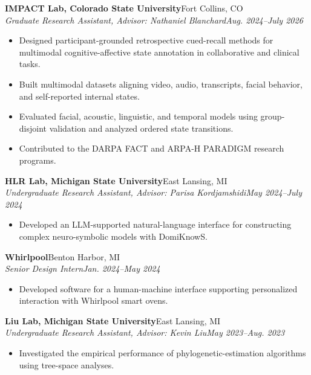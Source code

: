 \documentclass[9pt,letterpaper]{article}
\newcommand{\entry}[4]{\textbf{#1}\hfill #2\\\textit{#3}\hfill\textit{#4}\vspace{-3pt}}
\begin{document}
\entry{IMPACT Lab, Colorado State University}{Fort Collins, CO}{Graduate Research Assistant, Advisor: Nathaniel Blanchard}{Aug. 2024--July 2026}
\begin{itemize}
\item Designed participant-grounded retrospective cued-recall methods for multimodal cognitive-affective state annotation in collaborative and clinical tasks.
\item Built multimodal datasets aligning video, audio, transcripts, facial behavior, and self-reported internal states.
\item Evaluated facial, acoustic, linguistic, and temporal models using group-disjoint validation and analyzed ordered state transitions.
\item Contributed to the DARPA FACT and ARPA-H PARADIGM research programs.
\end{itemize}

\entry{HLR Lab, Michigan State University}{East Lansing, MI}{Undergraduate Research Assistant, Advisor: Parisa Kordjamshidi}{May 2024--July 2024}
\begin{itemize}
\item Developed an LLM-supported natural-language interface for constructing complex neuro-symbolic models with DomiKnowS.
\end{itemize}

\entry{Whirlpool}{Benton Harbor, MI}{Senior Design Intern}{Jan. 2024--May 2024}
\begin{itemize}
\item Developed software for a human-machine interface supporting personalized interaction with Whirlpool smart ovens.
\end{itemize}

\entry{Liu Lab, Michigan State University}{East Lansing, MI}{Undergraduate Research Assistant, Advisor: Kevin Liu}{May 2023--Aug. 2023}
\begin{itemize}
\item Investigated the empirical performance of phylogenetic-estimation algorithms using tree-space analyses.
\end{itemize}
\end{document}
